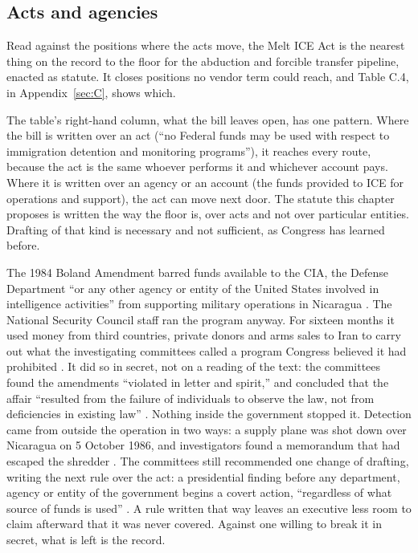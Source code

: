 \subsection{Acts and agencies}
\label{sec:11.4.2}
Read against the positions where the acts move, the Melt ICE Act is the nearest thing on the record to the floor for the abduction and forcible transfer pipeline, enacted as statute. It closes positions no vendor term could reach, and Table C.4, in Appendix~\ref{sec:C}, shows which.

The table's right-hand column, what the bill leaves open, has one pattern. Where the bill is written over an act (“no Federal funds may be used with respect to immigration detention and monitoring programs”), it reaches every route, because the act is the same whoever performs it and whichever account pays. Where it is written over an agency or an account (the funds provided to ICE for operations and support), the act can move next door.
The statute this chapter proposes is written the way the floor is, over acts and not over particular entities. Drafting of that kind is necessary and not sufficient, as Congress has learned before.

The 1984 Boland Amendment barred funds available to the CIA, the Defense Department “or any other agency or entity of the United States involved in intelligence activities” from supporting military operations in Nicaragua \autocite[§8066(a)]{boland1984}. The National Security Council staff ran the program anyway. For sixteen months it used money from third countries, private donors and arms sales to Iran to carry out what the investigating committees called a program Congress believed it had prohibited \autocite{irancontra1987}. It did so in secret, not on a reading of the text: the committees found the amendments “violated in letter and spirit,” and concluded that the affair “resulted from the failure of individuals to observe the law, not from deficiencies in existing law” \autocite[344, 362]{irancontra1987}. Nothing inside the government stopped it. Detection came from outside the operation in two ways: a supply plane was shot down over Nicaragua on 5 October 1986, and investigators found a memorandum that had escaped the shredder \autocite{irancontra1987}. The committees still recommended one change of drafting, writing the next rule over the act: a presidential finding before any department, agency or entity of the government begins a covert action, “regardless of what source of funds is used” \autocite[363]{irancontra1987}. A rule written that way leaves an executive less room to claim afterward that it was never covered. Against one willing to break it in secret, what is left is the record.

